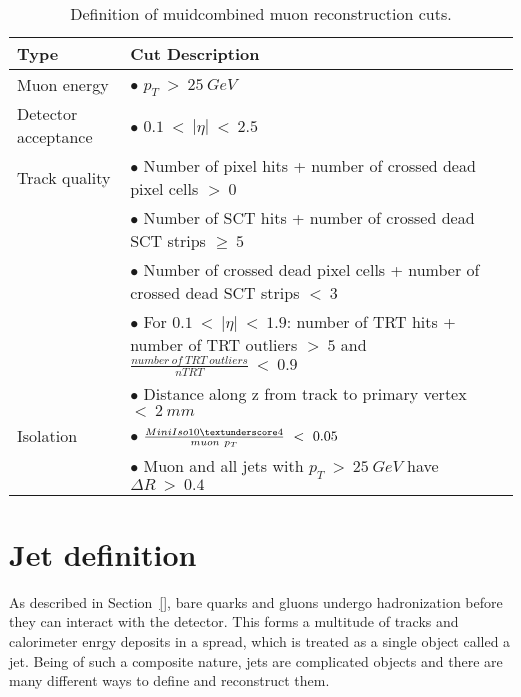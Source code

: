 \begin{table}
\begin{center}
\begin{tabular}{|p{4cm}|p{11cm}|}
\hline
Type & Cut Description \\
\hline
Muon energy & $\bullet$ $p_T\ >\ 25\ GeV$ \\
\hline
Detector acceptance & $\bullet$ $0.1\ <\ |\eta|\ <\ 2.5$ \\
\hline
Track quality & $\bullet$ Number of pixel hits + number of crossed dead pixel cells $>\ 0$ \\
              & $\bullet$ Number of SCT hits + number of crossed dead SCT strips $\ge\ 5$ \\
              & $\bullet$ Number of crossed dead pixel cells + number of crossed dead SCT strips $<\ 3$ \\
              & $\bullet$ For $0.1\ <\ |\eta|\ <\ 1.9$: number of TRT hits + number of TRT outliers $>\ 5$ and $\frac{number\ of\ TRT\ outliers}{nTRT}\ <\ 0.9$ \\
              & $\bullet$ Distance along z from track to primary vertex $<\ 2\ mm$ \\
\hline
Isolation & $\bullet$ $\frac{MiniIso10 \textunderscore 4}{muon\ p_T}\ <\ 0.05$ \\
          & $\bullet$ Muon and all jets with $p_T\ >\ 25\ GeV$ have $\Delta R\ >\ 0.4$ \\
\hline
\end{tabular}
\caption{Definition of muidcombined muon reconstruction cuts.}
\label{TABLE-OBJ-MU}
\end{center}
\end{table}


\section{Jet definition}
\label{SECTION-OBJ-JET}
As described in Section~\ref{}, bare quarks and gluons undergo hadronization before they can interact with the detector. This forms a multitude of tracks and calorimeter enrgy deposits in a spread, which is treated as a single object called a jet. Being of such a composite nature, jets are complicated objects and there are many different ways to define and reconstruct them.

